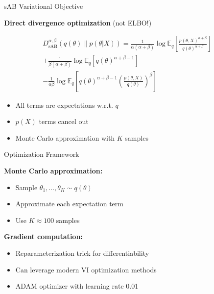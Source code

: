 \documentclass{beamer}
\theoremstyle{definition}
\theoremstyle{plain}
\begin{document}
\begin{frame}{sAB Variational Objective}

\textbf{Direct divergence optimization} (not ELBO!)

\begin{multline*}
D^{\alpha,\beta}_{\text{sAB}}(q(\theta)\|p(\theta|X)) = \frac{1}{\alpha(\alpha+\beta)} \log \mathbb{E}_q\left[\frac{p(\theta,X)^{\alpha+\beta}}{q(\theta)^{\alpha+\beta}}\right] \\
+ \frac{1}{\beta(\alpha+\beta)} \log \mathbb{E}_q\left[q(\theta)^{\alpha+\beta-1}\right] \\
- \frac{1}{\alpha\beta} \log \mathbb{E}_q\left[q(\theta)^{\alpha+\beta-1}\left(\frac{p(\theta,X)}{q(\theta)}\right)^{\beta}\right]
\end{multline*}

\vspace{0.3cm}

\begin{itemize}
    \item All terms are expectations w.r.t. $q$
    \item $p(X)$ terms cancel out
    \item Monte Carlo approximation with $K$ samples
\end{itemize}

\end{frame}
\begin{frame}{Optimization Framework}

\textbf{Monte Carlo approximation:}
\begin{itemize}
    \item Sample $\theta_1, \ldots, \theta_K \sim q(\theta)$
    \item Approximate each expectation term
    \item Use $K \approx 100$ samples
\end{itemize}

\vspace{0.3cm}

\textbf{Gradient computation:}
\begin{itemize}
    \item Reparameterization trick for differentiability
    \item Can leverage modern VI optimization methods
    \item ADAM optimizer with learning rate 0.01
\end{itemize}

\vspace{0.3cm}

\end{frame}
\end{document}
